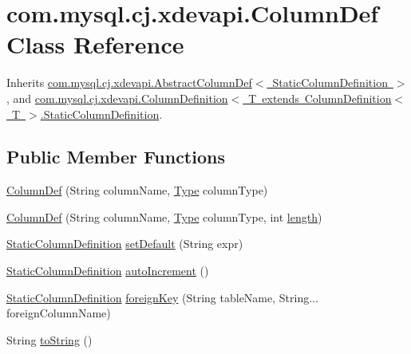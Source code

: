 \hypertarget{classcom_1_1mysql_1_1cj_1_1xdevapi_1_1_column_def}{}\section{com.\+mysql.\+cj.\+xdevapi.\+Column\+Def Class Reference}
\label{classcom_1_1mysql_1_1cj_1_1xdevapi_1_1_column_def}


Inherits \mbox{\hyperlink{classcom_1_1mysql_1_1cj_1_1xdevapi_1_1_abstract_column_def}{com.\+mysql.\+cj.\+xdevapi.\+Abstract\+Column\+Def$<$ Static\+Column\+Definition $>$}}, and \mbox{\hyperlink{interfacecom_1_1mysql_1_1cj_1_1xdevapi_1_1_column_definition_1_1_static_column_definition}{com.\+mysql.\+cj.\+xdevapi.\+Column\+Definition$<$ T extends Column\+Definition$<$ T $>$.\+Static\+Column\+Definition}}.

\subsection*{Public Member Functions}
\begin{DoxyCompactItemize}
\item 
\mbox{\hyperlink{classcom_1_1mysql_1_1cj_1_1xdevapi_1_1_column_def_a17b41b3c7326b878f6b4de4cd4a53484}{Column\+Def}} (String column\+Name, \mbox{\hyperlink{enumcom_1_1mysql_1_1cj_1_1xdevapi_1_1_type}{Type}} column\+Type)
\item 
\mbox{\hyperlink{classcom_1_1mysql_1_1cj_1_1xdevapi_1_1_column_def_a7ef40be3a09cd586c0612d2cf182d7b6}{Column\+Def}} (String column\+Name, \mbox{\hyperlink{enumcom_1_1mysql_1_1cj_1_1xdevapi_1_1_type}{Type}} column\+Type, int \mbox{\hyperlink{classcom_1_1mysql_1_1cj_1_1xdevapi_1_1_abstract_column_def_a78d0c29138f467d0a661dacc2700ceab}{length}})
\item 
\mbox{\hyperlink{interfacecom_1_1mysql_1_1cj_1_1xdevapi_1_1_column_definition_1_1_static_column_definition}{Static\+Column\+Definition}} \mbox{\hyperlink{classcom_1_1mysql_1_1cj_1_1xdevapi_1_1_column_def_a2c34dd13c55b62ebb84e7c98a0d01ad3}{set\+Default}} (String expr)
\item 
\mbox{\hyperlink{interfacecom_1_1mysql_1_1cj_1_1xdevapi_1_1_column_definition_1_1_static_column_definition}{Static\+Column\+Definition}} \mbox{\hyperlink{classcom_1_1mysql_1_1cj_1_1xdevapi_1_1_column_def_af5d7d177c86260c52e75c44a2863330e}{auto\+Increment}} ()
\item 
\mbox{\hyperlink{interfacecom_1_1mysql_1_1cj_1_1xdevapi_1_1_column_definition_1_1_static_column_definition}{Static\+Column\+Definition}} \mbox{\hyperlink{classcom_1_1mysql_1_1cj_1_1xdevapi_1_1_column_def_a55fde7312a45fd6dc7bca76406c018cd}{foreign\+Key}} (String table\+Name, String... foreign\+Column\+Name)
\item 
String \mbox{\hyperlink{classcom_1_1mysql_1_1cj_1_1xdevapi_1_1_column_def_ae26162c5f6538de1eec31032e130593b}{to\+String}} ()
\end{DoxyCompactItemize}
